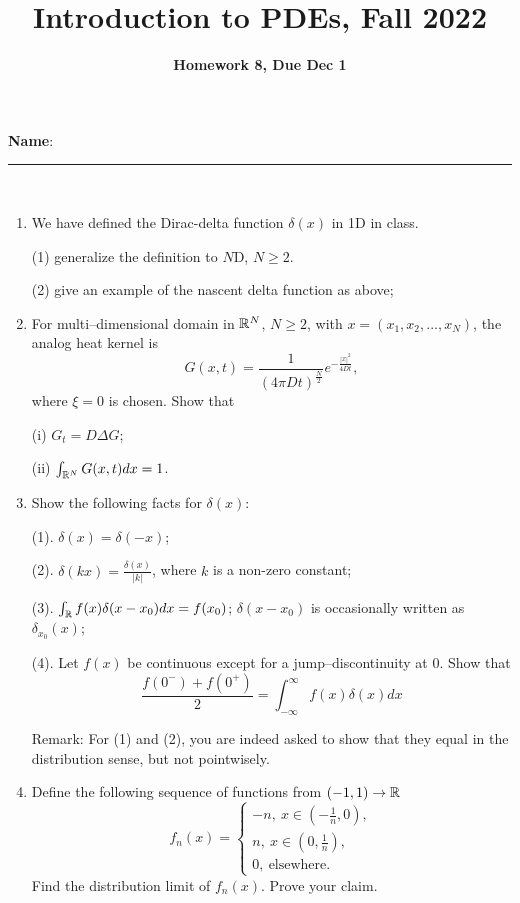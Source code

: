 \documentclass[6pt]{article}
\title{Introduction to PDEs, Fall 2022}
\author{\textbf{Homework 8, Due Dec 1}}
\date{}
\numberwithin{equation}{section}
\def\mathbb{\Bbb}
\begin{document}
\maketitle

\textbf{Name}:\rule{1 in}{0.001 in} \\
\begin{enumerate}

\item  We have defined the Dirac-delta function $\delta(x)$ in 1D in class.

(1) generalize the definition to $N$D, $N\geq2$.

(2) give an example of the nascent delta function as above;


\item For multi--dimensional domain in $\mathbb R^N$, $N\geq2$, with $x=(x_1,x_2,...,x_N)$, the analog heat kernel is
\[G(x,t)=\frac{1}{{(4\pi Dt)}^\frac{N}{2}}e^{-\frac{|x|^2}{4Dt}},\]
where $\xi=0$ is chosen.  Show that

(i) $G_t=D\Delta G$;

(ii) $\int_{\mathbb R^N}G(x,t)dx=1$.


\item  Show the following facts for $\delta(x)$:

(1).  $\delta(x)=\delta(-x)$;

(2). $\delta(kx)=\frac{\delta(x)}{\vert k\vert }$, where $k$ is a non-zero constant;

(3).  $\int_\mathbb{R} f(x)\delta(x-x_0) dx=f(x_0)$; $\delta(x-x_0)$ is occasionally written as $\delta_{x_0}(x)$;

(4).  Let $f(x)$ be continuous except for a jump--discontinuity at $0$.  Show that
\[\frac{f(0^-)+f(0^+)}{2}=\int_{-\infty}^\infty f(x)\delta(x)dx\]

Remark: For (1) and (2), you are indeed asked to show that they equal in the distribution sense, but not pointwisely.





\item  Define the following sequence of functions from $(-1,1)\rightarrow \mathbb{R}$
\begin{equation}f_n(x)=
\left\{
\begin{array}{ll}
-n,~x\in(-\frac{1}{n},0),\\
n,~x\in(0,\frac{1}{n}),\\
0,~\text{elsewhere}.
\end{array}
\right.
\end{equation}
Find the distribution limit of $f_n(x)$.  Prove your claim.


\end{enumerate}
\end{document}
